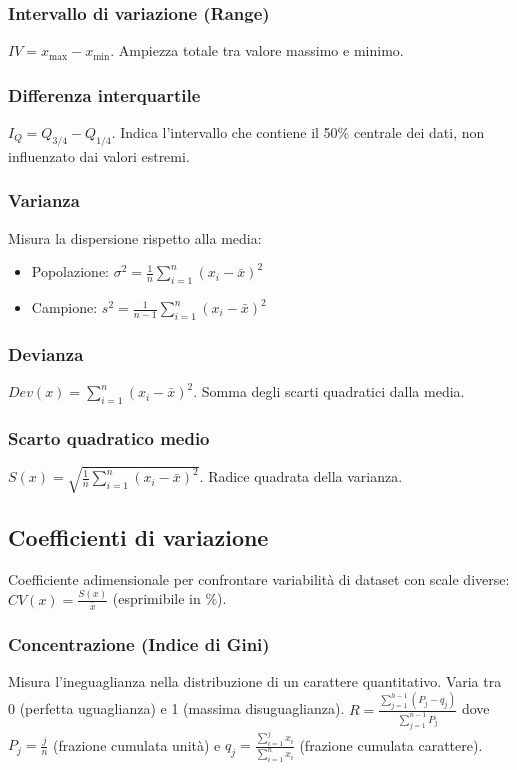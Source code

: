 \documentclass[a4paper,11pt]{article}
\begin{document}
\subsubsection{Intervallo di variazione (Range)}
$IV = x_{\max} - x_{\min}$. Ampiezza totale tra valore massimo e minimo.

\subsubsection{Differenza interquartile}
$I_Q = Q_{3/4} - Q_{1/4}$. Indica l'intervallo che contiene il 50\% centrale dei dati, non influenzato dai valori estremi.

\subsubsection{Varianza}
Misura la dispersione rispetto alla media:
\begin{itemize}
    \item Popolazione: $\sigma^2 = \frac{1}{n}\sum_{i=1}^{n}(x_i - \bar{x})^2$
    \item Campione: $s^2 = \frac{1}{n-1}\sum_{i=1}^{n}(x_i - \bar{x})^2$
\end{itemize}

\subsubsection{Devianza}
$Dev(x) = \sum_{i=1}^{n}(x_i - \bar{x})^2$. Somma degli scarti quadratici dalla media.

\subsubsection{Scarto quadratico medio}
$S(x) = \sqrt{\frac{1}{n}\sum_{i=1}^{n}(x_i - \bar{x})^2}$. Radice quadrata della varianza.

\subsection{Coefficienti di variazione}
Coefficiente adimensionale per confrontare variabilità di dataset con scale diverse:
$CV(x) = \frac{S(x)}{\bar{x}}$ (esprimibile in \%).

\subsubsection{Concentrazione (Indice di Gini)}
Misura l'ineguaglianza nella distribuzione di un carattere quantitativo. Varia tra 0 (perfetta uguaglianza) e 1 (massima disuguaglianza).
$R = \frac{\sum_{j=1}^{h-1}(P_j - q_j)}{\sum_{j=1}^{n-1} P_j}$
dove $P_j = \frac{j}{n}$ (frazione cumulata unità) e $q_j = \frac{\sum_{i=1}^{j} x_i}{\sum_{i=1}^{n} x_i}$ (frazione cumulata carattere).
\end{document}
